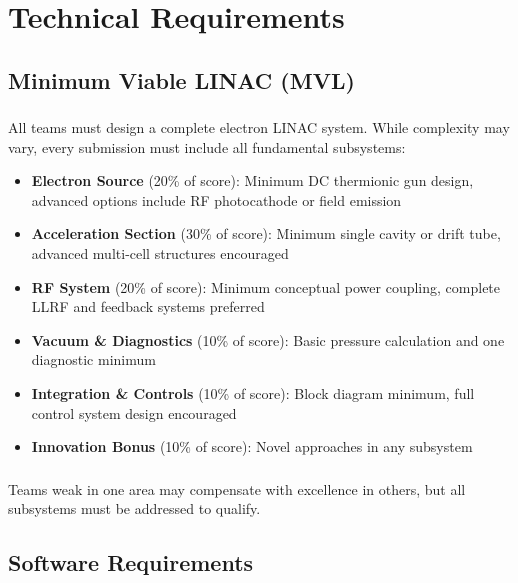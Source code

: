 
\renewcommand{\thesection}{T}
\section{Technical Requirements}

\subsection{Minimum Viable LINAC (MVL)}

\subsubsection{}
All teams must design a complete electron LINAC system. While complexity may vary, every submission must include all fundamental subsystems:

\begin{itemize}[noitemsep]
    \item \textbf{Electron Source} (20\% of score): Minimum DC thermionic gun design, advanced options include RF photocathode or field emission
    \item \textbf{Acceleration Section} (30\% of score): Minimum single cavity or drift tube, advanced multi-cell structures encouraged
    \item \textbf{RF System} (20\% of score): Minimum conceptual power coupling, complete LLRF and feedback systems preferred
    \item \textbf{Vacuum \& Diagnostics} (10\% of score): Basic pressure calculation and one diagnostic minimum
    \item \textbf{Integration \& Controls} (10\% of score): Block diagram minimum, full control system design encouraged
    \item \textbf{Innovation Bonus} (10\% of score): Novel approaches in any subsystem
\end{itemize}

\subsubsection{}
Teams weak in one area may compensate with excellence in others, but all subsystems must be addressed to qualify.

\subsection{Software Requirements}


